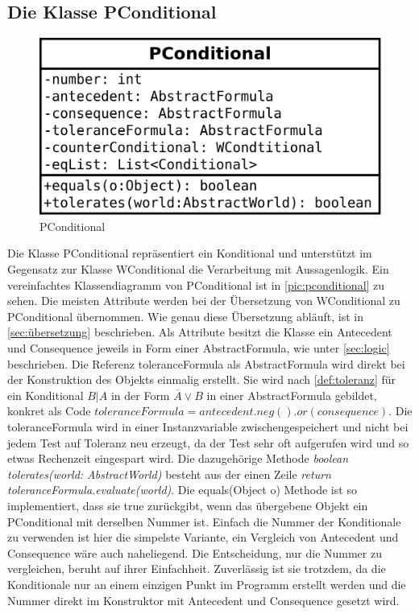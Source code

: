 \documentclass[12pt,a4paper]{article}
\begin{document}
\subsection{Die Klasse PConditional}


\begin{figure}
\includegraphics[width=0.45\linewidth]{bilder/PConditional.png}
\caption{PConditional}
\label{pic:pconditional}
\end{figure}


Die Klasse PConditional repräsentiert ein Konditional und unterstützt im Gegensatz zur Klasse WConditional die Verarbeitung mit Aussagenlogik. Ein vereinfachtes Klassendiagramm von PConditional ist in \autoref{pic:pconditional} zu sehen. Die meisten Attribute werden bei der Übersetzung von WConditional zu PConditional übernommen. Wie genau diese Übersetzung abläuft, ist in \autoref{sec:übersetzung} beschrieben. Als Attribute besitzt die Klasse ein Antecedent und Consequence jeweils in Form einer AbstractFormula, wie unter \autoref{sec:logic} beschrieben. Die Referenz toleranceFormula als AbstractFormula wird direkt bei der Konstruktion des Objekts einmalig erstellt. Sie wird nach \autoref{def:toleranz} für ein Konditional $B|A$ in der Form $\overline{A} \vee B$ in einer AbstractFormula gebildet, konkret als Code  $toleranceFormula = antecedent.neg().or(consequence)$. Die toleranceFormula wird in einer Instanzvariable zwischengespeichert und nicht bei jedem Test   auf Toleranz neu erzeugt, da der Test sehr oft aufgerufen wird und so etwas Rechenzeit eingespart wird. Die dazugehörige Methode \textit{boolean tolerates(world: AbstractWorld)} besteht aus der einen Zeile \textit{return toleranceFormula.evaluate(world)}. Die equals(Object o) Methode ist so implementiert, dass sie true zurückgibt, wenn das übergebene Objekt ein PConditional mit derselben Nummer ist. Einfach die Nummer der Konditionale zu verwenden ist hier die simpelste Variante, ein Vergleich von Antecedent und Consequence wäre auch naheliegend. Die Entscheidung, nur die Nummer zu vergleichen, beruht auf ihrer Einfachheit. Zuverlässig ist sie trotzdem, da die Konditionale nur an einem einzigen Punkt im Programm erstellt werden und die Nummer direkt im Konstruktor mit Antecedent und Consequence gesetzt wird.
\end{document}
